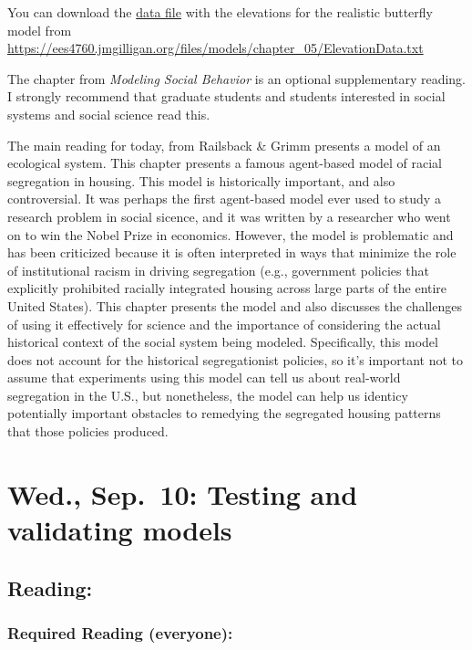 \documentclass[
]{article}
\begin{document}
You can download the
\href{/files/models/chapter_05/ElevationData.txt}{data file} with the
elevations for the realistic butterfly model from
\url{https://ees4760.jmgilligan.org/files/models/chapter_05/ElevationData.txt}

The chapter from \emph{Modeling Social Behavior} is an optional
supplementary reading. I strongly recommend that graduate students and
students interested in social systems and social science read this.

The main reading for today, from Railsback \& Grimm presents a model of
an ecological system. This chapter presents a famous agent-based model
of racial segregation in housing. This model is historically important,
and also controversial. It was perhaps the first agent-based model ever
used to study a research problem in social sicence, and it was written
by a researcher who went on to win the Nobel Prize in economics.
However, the model is problematic and has been criticized because it is
often interpreted in ways that minimize the role of institutional racism
in driving segregation (e.g., government policies that explicitly
prohibited racially integrated housing across large parts of the entire
United States). This chapter presents the model and also discusses the
challenges of using it effectively for science and the importance of
considering the actual historical context of the social system being
modeled. Specifically, this model does not account for the historical
segregationist policies, so it's important not to assume that
experiments using this model can tell us about real-world segregation in
the U.S., but nonetheless, the model can help us identicy potentially
important obstacles to remedying the segregated housing patterns that
those policies produced.

\section{Wed., Sep.~10: Testing and validating
models}\label{wed.-sep.-10-testing-and-validating-models}

\subsection{Reading:}\label{reading-6}

\subsubsection{Required Reading
(everyone):}\label{required-reading-everyone-5}
\end{document}
